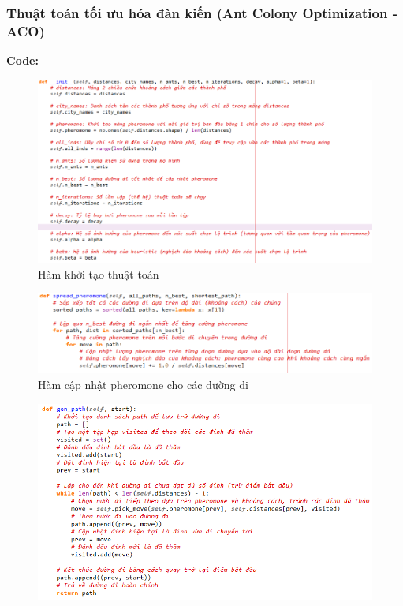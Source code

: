 \documentclass[14pt]{article}
\begin{document}
	\subsubsection{Thuật toán tối ưu hóa đàn kiến (Ant Colony Optimization - ACO)}
	\textbf{Code:}
	\begin{center}
		\begin{figure}[htbp]
			\centering
			\includegraphics[width=\textwidth]{./Image/Hàm khởi tạo ACO.png}
			\caption{Hàm khởi tạo thuật toán}
			\label{fig:mylabel}
		\end{figure}
		\begin{figure}[htbp]
			\centering
			\includegraphics[width=\textwidth]{./Image/Hàm cập nhật pheromone ACO.png}
			\caption{Hàm cập nhật pheromone cho các đường đi}
			\label{fig:mylabel}
		\end{figure}
		\begin{figure}[htbp]
			\centering
			\includegraphics[width=\textwidth]{./Image/Hàm lưu lại đường đi ACO.png}

\end{figure}
\end{center}
\end{document}
